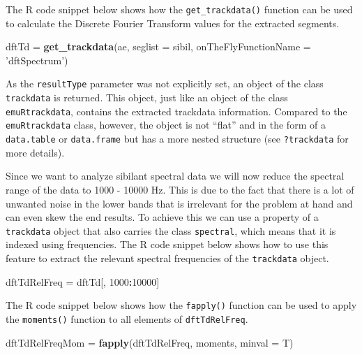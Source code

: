 \documentclass[]{book}
\newenvironment{Shaded}{\begin{snugshade}}{\end{snugshade}}
\newcommand{\DataTypeTok}[1]{\textcolor[rgb]{0.13,0.29,0.53}{#1}}
\newcommand{\DecValTok}[1]{\textcolor[rgb]{0.00,0.00,0.81}{#1}}
\newcommand{\KeywordTok}[1]{\textcolor[rgb]{0.13,0.29,0.53}{\textbf{#1}}}
\newcommand{\NormalTok}[1]{#1}
\newcommand{\OperatorTok}[1]{\textcolor[rgb]{0.81,0.36,0.00}{\textbf{#1}}}
\newcommand{\StringTok}[1]{\textcolor[rgb]{0.31,0.60,0.02}{#1}}
\begin{document}
The R code snippet below shows how the \texttt{get\_trackdata()} function can be used to calculate the Discrete Fourier Transform values for the extracted segments.

\begin{Shaded}
\begin{Highlighting}[]
\NormalTok{dftTd =}\StringTok{ }\KeywordTok{get_trackdata}\NormalTok{(ae,}
                      \DataTypeTok{seglist =}\NormalTok{ sibil,}
                      \DataTypeTok{onTheFlyFunctionName =} \StringTok{'dftSpectrum'}\NormalTok{)}
\end{Highlighting}
\end{Shaded}

As the \texttt{resultType} parameter was not explicitly set, an object of the class \texttt{trackdata} is returned. This object, just like an object of the class \texttt{emuRtrackdata}, contains the extracted trackdata information. Compared to the \texttt{emuRtrackdata} class, however, the object is not ``flat'' and in the form of a \texttt{data.table} or \texttt{data.frame} but has a more nested structure (see \texttt{?trackdata} for more details).

Since we want to analyze sibilant spectral data we will now reduce the spectral range of the data to 1000 - 10000 Hz. This is due to the fact that there is a lot of unwanted noise in the lower bands that is irrelevant for the problem at hand and can even skew the end results. To achieve this we can use a property of a \texttt{trackdata} object that also carries the class \texttt{spectral}, which means that it is indexed using frequencies. The R code snippet below shows how to use this feature to extract the relevant spectral frequencies of the \texttt{trackdata} object.

\begin{Shaded}
\begin{Highlighting}[]
\NormalTok{dftTdRelFreq =}\StringTok{ }\NormalTok{dftTd[, }\DecValTok{1000}\OperatorTok{:}\DecValTok{10000}\NormalTok{]}
\end{Highlighting}
\end{Shaded}

The R code snippet below shows how the \texttt{fapply()} function can be used to apply the \texttt{moments()} function to all elements of \texttt{dftTdRelFreq}.

\begin{Shaded}
\begin{Highlighting}[]
\NormalTok{dftTdRelFreqMom =}\StringTok{ }\KeywordTok{fapply}\NormalTok{(dftTdRelFreq, moments, }\DataTypeTok{minval =}\NormalTok{ T)}
\end{Highlighting}
\end{Shaded}
\end{document}
